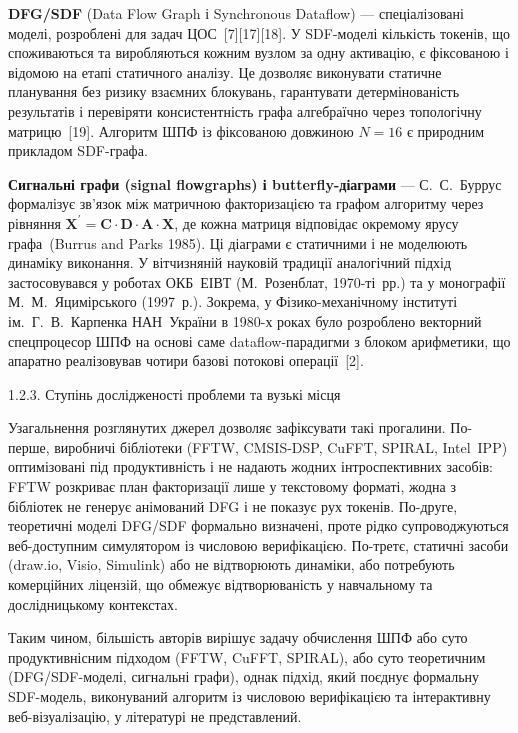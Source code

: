 \textbf{DFG/SDF} (Data Flow Graph і Synchronous Dataflow) ---
спеціалізовані моделі, розроблені для задач ЦОС~{[}7{]}{[}17{]}{[}18{]}.
У SDF-моделі кількість токенів, що споживаються та виробляються кожним
вузлом за одну активацію, є фіксованою і відомою на етапі статичного
аналізу. Це дозволяє виконувати статичне планування без ризику взаємних
блокувань, гарантувати детермінованість результатів і перевіряти
консистентність графа алгебраїчно через топологічну матрицю~{[}19{]}.
Алгоритм ШПФ із фіксованою довжиною \(N = 16\) є природним прикладом
SDF-графа.

\textbf{Сигнальні графи (signal flowgraphs) і butterfly-діаграми} ---
С.~С.~Буррус формалізує зв'язок між матричною факторизацією та графом
алгоритму через рівняння
\(\mathbf{X}^{\mathbf{'}} = \mathbf{C} \cdot \mathbf{D} \cdot \mathbf{A} \cdot \mathbf{X}\),
де кожна матриця відповідає окремому ярусу графа~(Burrus and Parks
1985). Ці діаграми є статичними і не моделюють динаміку виконання. У
вітчизняній науковій традиції аналогічний підхід застосовувався у
роботах ОКБ~ЕІВТ (М.~Розенблат, 1970-ті~рр.) та у монографії
М.~М.~Яцимірського (1997~р.). Зокрема, у Фізико-механічному інституті
ім.~Г.~В.~Карпенка НАН~України в 1980-х роках було розроблено векторний
спецпроцесор ШПФ на основі саме dataflow-парадигми з блоком арифметики,
що апаратно реалізовував чотири базові потокові операції~{[}2{]}.

1.2.3. Ступінь дослідженості проблеми та вузькі місця

Узагальнення розглянутих джерел дозволяє зафіксувати такі прогалини.
По-перше, виробничі бібліотеки (FFTW, CMSIS-DSP, CuFFT, SPIRAL,
Intel~IPP) оптимізовані під продуктивність і не надають жодних
інтроспективних засобів: FFTW розкриває план факторизації лише у
текстовому форматі, жодна з бібліотек не генерує анімований DFG і не
показує рух токенів. По-друге, теоретичні моделі DFG/SDF формально
визначені, проте рідко супроводжуються веб-доступним симулятором із
числовою верифікацією. По-третє, статичні засоби (draw.io, Visio,
Simulink) або не відтворюють динаміки, або потребують комерційних
ліцензій, що обмежує відтворюваність у навчальному та дослідницькому
контекстах.

Таким чином, більшість авторів вирішує задачу обчислення ШПФ або суто
продуктивнісним підходом (FFTW, CuFFT, SPIRAL), або суто теоретичним
(DFG/SDF-моделі, сигнальні графи), однак підхід, який поєднує формальну
SDF-модель, виконуваний алгоритм із числовою верифікацією та
інтерактивну веб-візуалізацію, у літературі не представлений.


